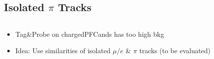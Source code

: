 \documentclass{beamer}
\begin{document}
\subsection{Isolated $\pi$ Tracks}
\begin{frame}
\begin{columns}
 \begin{column}{0.65\textwidth}
  \begin{itemize}
   \item Tag\&Probe on chargedPFCands has too high bkg
   \item Idea: Use similarities of isolated $\mu/e$ \& $\pi$ tracks (to be evaluated)
  \end{itemize}

 \end{column}
 \begin{column}{0.35\textwidth}

\end{column}
\end{columns}
\end{frame}
\end{document}

